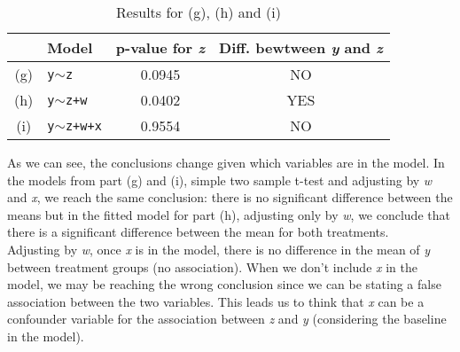 \documentclass[11pt,a4paper]{article}
\begin{document}
\begin{enumerate}
\begin{table}[h!]
\centering
\begin{tabular}{clcc}
\hline
 & Model & p-value for \emph{z} & Diff. bewtween \emph{y} and \emph{z}\\
\hline
(g) & \texttt{y$\sim$z} & 0.0945 & NO\\
(h) & \texttt{y$\sim$z+w} & 0.0402 & YES\\
(i) & \texttt{y$\sim$z+w+x} & 0.9554 & NO\\
\hline
\end{tabular}
\caption{Results for (g), (h) and (i)}
\end{table}

As we can see, the conclusions change given which variables are in the model. In the models from part 
(g) and (i), simple two sample t-test and adjusting by \emph{w} and \emph{x}, we reach the same conclusion: there is no significant difference between the means but in the fitted model
 for part (h), adjusting only by \emph{w}, we conclude that there is a significant difference between the mean for both treatments. \\
Adjusting by \emph{w}, once \emph{x} is in the model, there is no difference in the mean of
 \emph{y} between treatment groups (no association). When we don't include \emph{x} in the model, we may be
 reaching the wrong conclusion since we can be stating a false association between the two variables. This leads 
us to think that \emph{x} can be a confounder variable for the association between \emph{z} 
and \emph{y} (considering the baseline in the model).

\end{enumerate}
\end{document}
